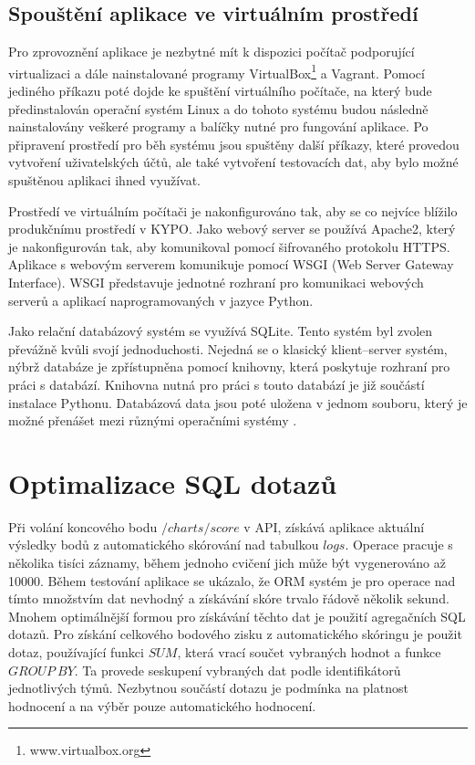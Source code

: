\documentclass[
  digital, %
  twoside, %
  table,   %
  lof,     %
  lot,     %
]{fithesis3}
\begin{document}
\subsection{Spouštění aplikace ve virtuálním prostředí}

Pro zprovoznění aplikace je nezbytné mít k dispozici počítač podporující virtualizaci a dále nainstalované programy VirtualBox\footnote{www.virtualbox.org} a Vagrant. Pomocí jediného příkazu poté dojde ke spuštění virtuálního počítače, na který bude předinstalován operační systém Linux a do tohoto systému budou následně nainstalovány veškeré programy a balíčky nutné pro fungování aplikace. Po připravení prostředí pro běh systému jsou spuštěny další příkazy, které provedou vytvoření uživatelských účtů, ale také vytvoření testovacích dat, aby bylo možné spuštěnou aplikaci ihned využívat. 

Prostředí ve virtuálním počítači je nakonfigurováno tak, aby se co nejvíce blížilo produkčnímu prostředí v KYPO. Jako webový server se používá Apache2, který je nakonfigurován tak, aby komunikoval pomocí šifrovaného protokolu HTTPS. Aplikace s webovým serverem komunikuje pomocí WSGI (Web Server Gateway Interface). WSGI představuje jednotné rozhraní pro komunikaci webových serverů a aplikací naprogramovaných v jazyce Python.

Jako relační databázový systém se využívá SQLite. Tento systém byl zvolen převážně kvůli svojí jednoduchosti. Nejedná se o klasický klient–server systém, nýbrž databáze je zpřístupněna pomocí knihovny, která poskytuje rozhraní pro práci s databází. Knihovna nutná pro práci s touto databází je již součástí instalace Pythonu. Databázová data jsou poté uložena v jednom souboru, který je možné přenášet mezi různými operačními systémy \cite{sqlite}.

\section{Optimalizace SQL dotazů}

Při volání koncového bodu $/charts/score$ v API, získává aplikace aktuální výsledky bodů z automatického skórování nad tabulkou $logs$. Operace pracuje s několika tisíci záznamy, během jednoho cvičení jich může být vygenerováno až 10000. Během testování aplikace se ukázalo, že ORM systém je pro operace nad tímto množstvím dat nevhodný a získávání skóre trvalo řádově několik sekund. Mnohem optimálnější formou pro získávání těchto dat je použití agregačních SQL dotazů. Pro získání celkového bodového zisku z automatického skóringu je použit dotaz, používající funkci $SUM$, která vrací součet vybraných hodnot a funkce $GROUP\ BY$. Ta provede seskupení vybraných dat podle identifikátorů jednotlivých týmů. Nezbytnou součástí dotazu je podmínka na platnost hodnocení a na výběr pouze automatického hodnocení.
\end{document}
